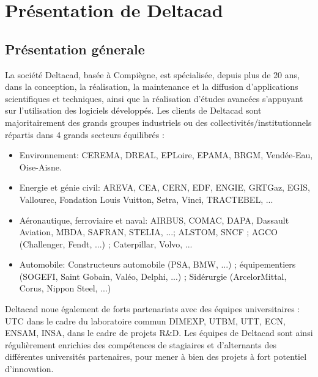 \chapter{Présentation de Deltacad}
\section{Présentation génerale}
La société Deltacad, basée à Compiègne, est spécialisée, depuis plus de 20 ans, dans la conception, la réalisation, la maintenance et la diffusion d'applications scientifiques et techniques, ainsi que la réalisation d'études avancées s'appuyant sur l'utilisation des logiciels développés.
Les clients de Deltacad sont majoritairement des grands groupes industriels ou des collectivités/institutionnels répartis dans 4 grands secteurs équilibrés :
\begin{itemize}
\item Environnement: CEREMA, DREAL, EPLoire, EPAMA, BRGM, Vendée-Eau, 
Oise-Aisne.
\item Energie et génie civil: AREVA, CEA, CERN, EDF, ENGIE, GRTGaz, EGIS,
Vallourec, Fondation Louis Vuitton, Setra, Vinci, TRACTEBEL, ...
\item Aéronautique, ferroviaire et naval: AIRBUS,
COMAC, DAPA, Dassault Aviation, MBDA, SAFRAN, STELIA, ...; ALSTOM,
SNCF ; AGCO (Challenger, Fendt, ...) ; Caterpillar, Volvo, ...
\item Automobile: Constructeurs automobile (PSA, BMW, ...) ; équipementiers 
(SOGEFI, Saint Gobain, Valéo, Delphi, ...) ; Sidérurgie (ArcelorMittal, Corus, Nippon Steel, ...) 
\end{itemize}
Deltacad noue également de forts partenariats avec des équipes universitaires : UTC dans le cadre du laboratoire commun DIMEXP, UTBM, UTT, ECN, ENSAM, INSA, dans le cadre de projets R\&D. 
Les équipes de Deltacad sont ainsi régulièrement enrichies des compétences de stagiaires et d'alternants des différentes universités partenaires, pour mener à bien des projets à fort potentiel d'innovation.

\newpage
